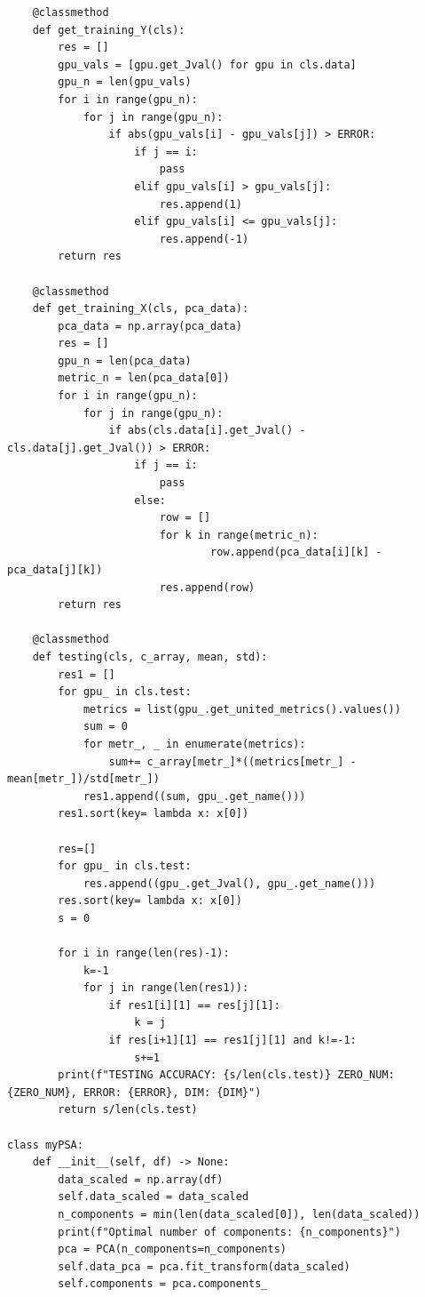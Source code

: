 \documentclass[14pt, a4paper]{extarticle}
\begin{document}
\begin{lstlisting}
    @classmethod
    def get_training_Y(cls):
        res = []
        gpu_vals = [gpu.get_Jval() for gpu in cls.data]
        gpu_n = len(gpu_vals)
        for i in range(gpu_n):
            for j in range(gpu_n):
                if abs(gpu_vals[i] - gpu_vals[j]) > ERROR:
                    if j == i:
                        pass
                    elif gpu_vals[i] > gpu_vals[j]:
                        res.append(1)
                    elif gpu_vals[i] <= gpu_vals[j]:
                        res.append(-1)
        return res
    
    @classmethod
    def get_training_X(cls, pca_data):
        pca_data = np.array(pca_data)
        res = []
        gpu_n = len(pca_data)
        metric_n = len(pca_data[0])
        for i in range(gpu_n):
            for j in range(gpu_n):
                if abs(cls.data[i].get_Jval() - cls.data[j].get_Jval()) > ERROR:
                    if j == i:
                        pass
                    else:
                        row = []
                        for k in range(metric_n):
                                row.append(pca_data[i][k] - pca_data[j][k])
                        res.append(row)
        return res
    
    @classmethod
    def testing(cls, c_array, mean, std):
        res1 = []
        for gpu_ in cls.test:
            metrics = list(gpu_.get_united_metrics().values())
            sum = 0
            for metr_, _ in enumerate(metrics):
                sum+= c_array[metr_]*((metrics[metr_] - mean[metr_])/std[metr_])
            res1.append((sum, gpu_.get_name()))
        res1.sort(key= lambda x: x[0])

        res=[]
        for gpu_ in cls.test:
            res.append((gpu_.get_Jval(), gpu_.get_name()))
        res.sort(key= lambda x: x[0])
        s = 0
        
        for i in range(len(res)-1):
            k=-1
            for j in range(len(res1)):
                if res1[i][1] == res[j][1]:
                    k = j
                if res[i+1][1] == res1[j][1] and k!=-1:
                    s+=1
        print(f"TESTING ACCURACY: {s/len(cls.test)} ZERO_NUM: {ZERO_NUM}, ERROR: {ERROR}, DIM: {DIM}")
        return s/len(cls.test)

class myPSA:
    def __init__(self, df) -> None:
        data_scaled = np.array(df)
        self.data_scaled = data_scaled
        n_components = min(len(data_scaled[0]), len(data_scaled))
        print(f"Optimal number of components: {n_components}")
        pca = PCA(n_components=n_components)
        self.data_pca = pca.fit_transform(data_scaled)
        self.components = pca.components_


\end{lstlisting}
\end{document}
